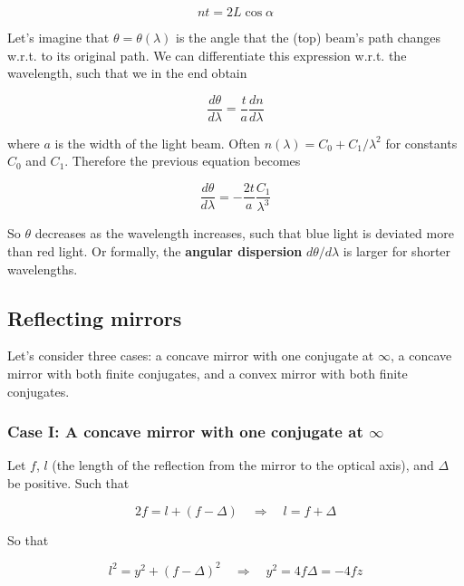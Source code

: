 \documentclass[a4paper]{article}
\begin{document}
\begin{equation}
    nt=2L\cos\alpha
\end{equation}

Let's imagine that $\theta=\theta(\lambda)$ is the angle that the (top) beam's path changes w.r.t. to its original path. We can differentiate this expression w.r.t. the wavelength, such that we in the end obtain

\begin{equation}
    \frac{d\theta}{d\lambda}=\frac{t}{a}\frac{dn}{d\lambda}
\end{equation}

where $a$ is the width of the light beam. Often $n(\lambda)=C_0+C_1/\lambda^2$ for constants $C_0$ and $C_1$. Therefore the previous equation becomes

\begin{equation}
    \frac{d\theta}{d\lambda}=-\frac{2t}{a}\frac{C_1}{\lambda^3}
\end{equation}

So $\theta$ decreases as the wavelength increases, such that blue light is deviated more than red light. Or formally, the \textbf{angular dispersion} $d\theta/d\lambda$ is larger for shorter wavelengths.

\subsection{Reflecting mirrors}

Let's consider three cases: a concave mirror with one conjugate at $\infty$, a concave mirror with both finite conjugates, and a convex mirror with both finite conjugates. 

\subsubsection*{Case I: A concave mirror with one conjugate at $\infty$}

Let $f$, $l$ (the length of the reflection from the mirror to the optical axis), and $\Delta$ be positive. Such that

\begin{equation}
    2f=l+(f-\Delta)\quad\Rightarrow\quad l=f+\Delta
\end{equation}

So that

\begin{equation}
    l^2=y^2+(f-\Delta)^2\quad\Rightarrow\quad y^2=4f\Delta=-4fz
\end{equation}
\end{document}
